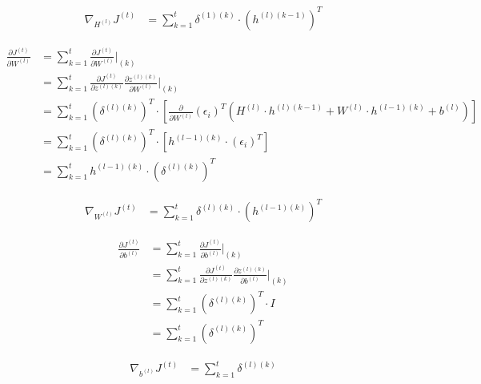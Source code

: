 \documentclass{article}
\begin{document}
	\begin{equation}
	\begin{aligned}
		\nabla_{H^{(l)}} J^{(t)} &= \sum_{k=1}^{t} \delta^{(1)(k)} \cdot  (h^{(l)(k-1)})^T
	\end{aligned}
	\end{equation}
	
	\begin{equation}
	\begin{aligned}
		\frac{\partial J^{(t)}}{\partial W^{(l)}} &= \sum_{k=1}^{t} \frac{\partial J^{(t)}}{\partial W^{(l)}}\bigg|_{(k)}  \\
		&= \sum_{k=1}^{t}
		\frac{\partial J^{(t)}}{\partial z^{(l)(k)}} 
		\frac{\partial z^{(l)(k)}}{\partial W^{(l)}}\bigg|_{(k)} \\
		&= \sum_{k=1}^{t}
		(\delta^{(l)(k)})^T \cdot \left[\frac{\partial }{\partial W^{(l)}}(\epsilon_i)^T (H^{(l)} \cdot h^{(l)(k-1)} + W^{(l)} \cdot h^{(l-1)(k)} + b^{(l)})\right] \\
		&= \sum_{k=1}^{t}
		(\delta^{(l)(k)})^T \cdot \left[h^{(l-1)(k)} \cdot (\epsilon_i)^T\right]\\	
		&= \sum_{k=1}^{t} h^{(l-1)(k)} \cdot (\delta^{(l)(k)})^T
	\end{aligned}
	\end{equation}
	
	\begin{equation}
	\begin{aligned}
		\nabla_{W^{(l)}} J^{(t)} &= \sum_{k=1}^{t} \delta^{(l)(k)} \cdot  (h^{(l-1)(k)})^T
	\end{aligned}
	\end{equation}	
		
	\begin{equation}
	\begin{aligned}
		\frac{\partial J^{(t)}}{\partial b^{(l)}} &= \sum_{k=1}^{t} \frac{\partial J^{(t)}}{\partial b^{(l)}}\bigg|_{(k)}  \\
		&= \sum_{k=1}^{t}
		\frac{\partial J^{(t)}}{\partial z^{(l)(k)}} 
		\frac{\partial z^{(l)(k)}}{\partial b^{(l)}}\bigg|_{(k)} \\
		&= \sum_{k=1}^{t}
		(\delta^{(l)(k)})^T \cdot I \\
		&= \sum_{k=1}^{t} (\delta^{(l)(k)})^T
	\end{aligned}
	\end{equation}
	
	\begin{equation}
	\begin{aligned}
		\nabla_{b^{(l)}} J^{(t)} &= \sum_{k=1}^{t} \delta^{(l)(k)} \\
	\end{aligned}
	\end{equation}	
	
\end{document}
